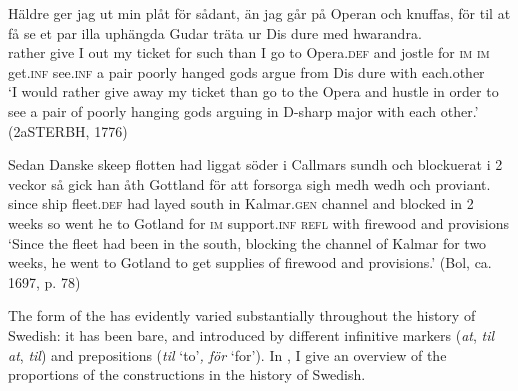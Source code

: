 \documentclass[output=paper]{langscibook}
\begin{document}
\ex  \label{ex:kalm:11c}
\gll Häldre ger jag ut min plåt för sådant, än jag går på Operan och knuffas, för til at få se et par illa uphängda Gudar träta ur Dis dure med hwarandra.\\
rather give I out my ticket for such than I go to Opera.\textsc{def} and jostle for \textsc{im} \textsc{im} get.\textsc{inf} see.\textsc{inf} a pair poorly hanged gods argue from Dis dure with each.other\\
\glt ‘I would rather give away my ticket than go to the Opera and hustle in order to see a pair of poorly hanging gods arguing in D-sharp major with each other.’ (2aSTERBH, 1776)

\ex \label{ex:kalm:11d}
\gll Sedan Danske skeep flotten had liggat söder i Callmars sundh och blockuerat i 2 veckor så gick han åth Gottland för att forsorga sigh medh wedh och proviant.\\
since  ship fleet.\textsc{def} had layed south in Kalmar.\textsc{gen} channel and blocked in 2 weeks so went he to Gotland for \textsc{im} support.\textsc{inf} \textsc{refl} with firewood and provisions\\ 
\glt ‘Since the  fleet had been in the south, blocking the channel of Kalmar for two weeks, he went to Gotland to get supplies of firewood and provisions.’ (Bol, ca. 1697, p. 78)
\z 
\z 


\begin{sloppypar}
The form of the  has evidently varied substantially throughout the history of Swedish: it has been bare, and introduced by different infinitive markers (\textit{at}, \textit{til at}, \textit{til}) and prepositions (\textit{til} ‘to’\textit{, för} ‘for’). In , I give an overview of the proportions of the  constructions in the history of Swedish. 
\end{sloppypar}
\end{document}
